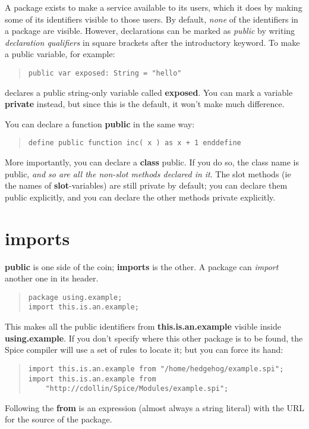 \documentclass{report}
\begin{document}
A package exists to make a service available to its users, which it does by
making some of its identifiers visible to those users. By default, {\em none} of
the identifiers in a package are visible. However, declarations can be marked
as {\em public} by writing {\em declaration qualifiers} in square brackets after
the introductory keyword. To make a public variable, for example:

\begin{quote}
\begin{verbatim}
public var exposed: String = "hello"
\end{verbatim}
\end{quote}
declares a public string-only variable called {\bf exposed}. You can mark a
variable {\bf private} instead, but since this is the default, it won't make much
difference.

You can declare a function {\bf public} in the same way:

\begin{quote}
\begin{verbatim}
define public function inc( x ) as x + 1 enddefine
\end{verbatim}
\end{quote}
More importantly, you can declare a {\bf class} public. If you do so, the
class name is public, {\em and so are all the non-slot methods declared in
it}. The slot methods (ie the names of {\bf slot}-variables) are still private by
default; you can declare them public explicitly, and you can declare the other
methods private explicitly.\section{imports}


{\bf public} is one side of the coin; {\bf imports} is the other. A package can
{\em import} another one in its header.

\begin{quote}
\begin{verbatim}
package using.example;
import this.is.an.example;
\end{verbatim}
\end{quote}
This makes all the public identifiers from {\bf this.is.an.example} visible inside
{\bf using.example}. If you don't specify where this other package is to be found,
the Spice compiler will use a set of rules to locate it; but you can force its
hand:

\begin{quote}
\begin{verbatim}
import this.is.an.example from "/home/hedgehog/example.spi";
import this.is.an.example from
    "http://cdollin/Spice/Modules/example.spi";
\end{verbatim}
\end{quote}
Following the {\bf from} is an expression (almost always a string literal) with
the URL for the source of the package.
\end{document}
